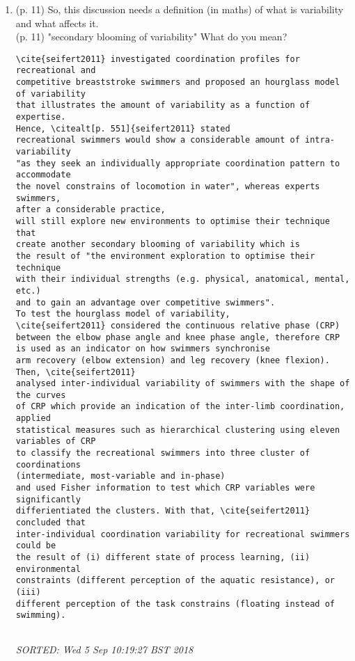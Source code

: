 \documentclass[10pt]{article}
\begin{document}
\begin{enumerate}[noitemsep,topsep=0pt]
	
\item (p. 11) So, this discussion needs a definition (in maths) of 
	what is variability and what affects it. \\
	 (p. 11) "secondary blooming of variability" What do you mean?
\begin{verbatim}
\cite{seifert2011} investigated coordination profiles for recreational and 
competitive breaststroke swimmers and proposed an hourglass model of variability 
that illustrates the amount of variability as a function of expertise.
Hence, \citealt[p. 551]{seifert2011} stated 
recreational swimmers would show a considerable amount of intra-variability 
"as they seek an individually appropriate coordination pattern to accommodate
the novel constrains of locomotion in water", whereas experts swimmers, 
after a considerable practice,  
will still explore new environments to optimise their technique that 
create another secondary blooming of variability which is 
the result of "the environment exploration to optimise their technique 
with their individual strengths (e.g. physical, anatomical, mental, etc.)
and to gain an advantage over competitive swimmers".
To test the hourglass model of variability, 
\cite{seifert2011} considered the continuous relative phase (CRP) 
between the elbow phase angle and knee phase angle, therefore CRP 
is used as an indicator on how swimmers synchronise
arm recovery (elbow extension) and leg recovery (knee flexion).
Then, \cite{seifert2011} 
analysed inter-individual variability of swimmers with the shape of the curves 
of CRP which provide an indication of the inter-limb coordination, applied 
statistical measures such as hierarchical clustering using eleven variables of CRP 
to classify the recreational swimmers into three cluster of coordinations 
(intermediate, most-variable and in-phase)
and used Fisher information to test which CRP variables were significantly 
differientiated the clusters. With that, \cite{seifert2011} concluded that 
inter-individual coordination variability for recreational swimmers could be 
the result of (i) different state of process learning, (ii) environmental 
constraints (different perception of the aquatic resistance), or (iii) 
different perception of the task constrains (floating instead of swimming).


\end{verbatim}
\textit{
SORTED: Wed  5 Sep 10:19:27 BST 2018
}
\\




\end{enumerate}
\end{document}
